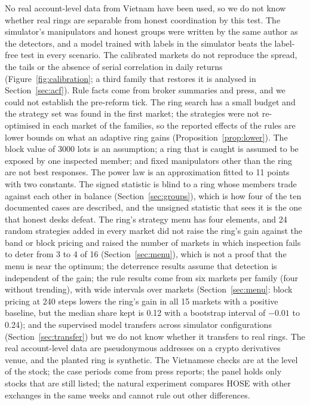 No real account-level data from Vietnam have been used, so we do not know whether real rings are separable from honest coordination by this test. The simulator's manipulators and honest groups were written by the same author as the detectors, and a model trained with labels in the simulator beats the label-free test in every scenario. The calibrated markets do not reproduce the spread, the tails or the absence of serial correlation in daily returns (Figure~\ref{fig:calibration}; a third family that restores it is analysed in Section~\ref{sec:acf}). Rule facts come from broker summaries and press, and we could not establish the pre-reform tick. The ring search has a small budget and the strategy set was found in the first market; the strategies were not re-optimised in each market of the families, so the reported effects of the rules are lower bounds on what an adaptive ring gains (Proposition~\ref{prop:lower}). The block value of 3000 lots is an assumption; a ring that is caught is assumed to be exposed by one inspected member; and fixed manipulators other than the ring are not best responses. The power law is an approximation fitted to 11 points with two constants. The signed statistic is blind to a ring whose members trade against each other in balance (Section~\ref{sec:groups}), which is how four of the ten documented cases are described, and the unsigned statistic that sees it is the one that honest desks defeat. The ring's strategy menu has four elements, and 24 random strategies added in every market did not raise the ring's gain against the band or block pricing and raised the number of markets in which inspection fails to deter from 3 to 4 of 16 (Section~\ref{sec:menu}), which is not a proof that the menu is near the optimum; the deterrence results assume that detection is independent of the gain; the rule results come from six markets per family (four without trending), with wide intervals over markets (Section~\ref{sec:menu}: block pricing at 240 steps lowers the ring's gain in all 15 markets with a positive baseline, but the median share kept is 0.12 with a bootstrap interval of $-0.01$ to 0.24); and the supervised model transfers across simulator configurations (Section~\ref{sec:transfer}) but we do not know whether it transfers to real rings. The real account-level data are pseudonymous addresses on a crypto derivatives venue, and the planted ring is synthetic. The Vietnamese checks are at the level of the stock; the case periods come from press reports; the panel holds only stocks that are still listed; the natural experiment compares HOSE with other exchanges in the same weeks and cannot rule out other differences.

